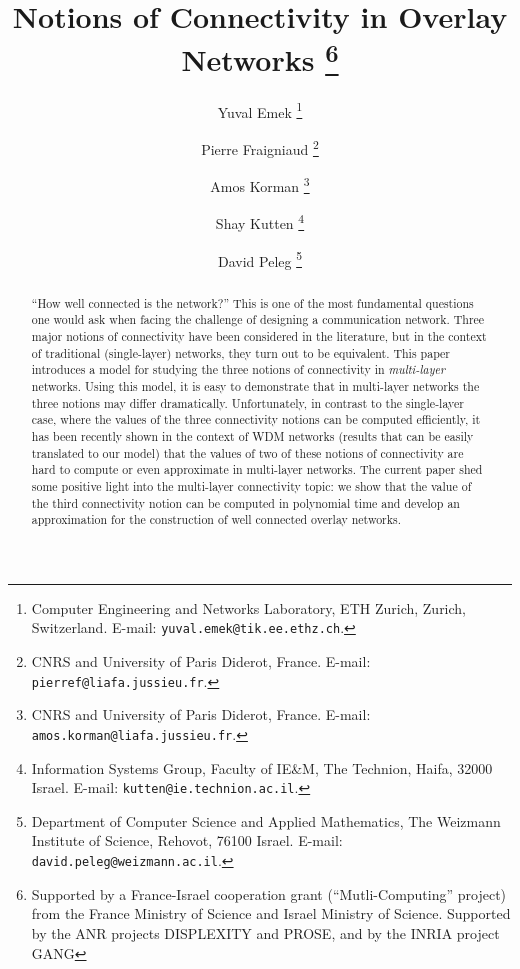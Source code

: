 \LongVersion \documentclass[11pt]{article}
\theoremstyle{definition}
\theoremstyle{plain}
\begin{document}
\LongVersion \author{
Yuval Emek
\thanks{Computer Engineering and Networks Laboratory, ETH Zurich, Zurich,
Switzerland.
E-mail: {\tt yuval.emek@tik.ee.ethz.ch}.}
\and
Pierre Fraigniaud
\thanks{CNRS and University of Paris Diderot, France.
E-mail: {\tt pierref@liafa.jussieu.fr}.}
\and
Amos Korman
\thanks{CNRS and University of Paris Diderot, France.
E-mail: {\tt amos.korman@liafa.jussieu.fr}.}
\and
Shay Kutten
\thanks{Information Systems Group, Faculty of IE\&M, The Technion,
Haifa, 32000 Israel. E-mail: {\tt kutten@ie.technion.ac.il}.}
\and
David Peleg
\thanks{
Department of Computer Science and Applied Mathematics, The Weizmann
Institute of Science, Rehovot, 76100 Israel.
E-mail: {\tt david.peleg@weizmann.ac.il}.}
}
\LongVersionEnd 

\title{Notions of Connectivity in Overlay Networks
\thanks{Supported by a France-Israel cooperation grant
(``Mutli-Computing'' project)
from the France Ministry of Science and Israel Ministry of Science. Supported by the ANR projects DISPLEXITY and PROSE, and by the INRIA project GANG}
}



\maketitle

\begin{abstract}
``How well connected is the network?''
This is one of the most fundamental questions one would ask when facing
the challenge of designing a communication network.
Three major notions of connectivity have been considered in the
literature, but in the context of traditional (single-layer) networks, they
turn out to be equivalent.
This paper introduces a model for studying the three notions of connectivity
in  {\em multi-layer} networks.
Using this model, it is easy to demonstrate that in multi-layer networks the
three notions may differ dramatically.
Unfortunately, in contrast to the single-layer case, where the values of the
three connectivity notions can be computed efficiently, it has been recently
shown in the context of WDM networks (results that can be easily translated to
our model) that the values of two of these notions of connectivity are hard to
compute or even approximate in multi-layer networks.
The current paper shed some positive light into the multi-layer connectivity
topic:
we show that the value of the third connectivity notion can be computed in
polynomial time and develop an approximation for the construction of well
connected overlay networks.
\end{abstract}
\end{document}
